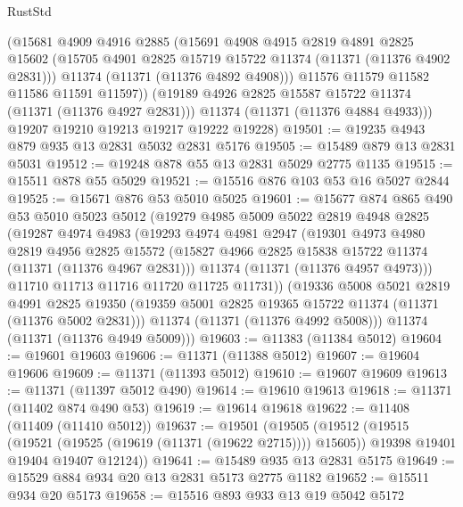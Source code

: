 \begin{lexlean}{RustStd}
\begin{coremodule}
          (@15681
            @4909
            @4916
            @2885
            (@15691
              @4908
              @4915
              @2819
              @4891
              @2825
              @15602
              (@15705 @4901 @2825 @15719 @15722 @11374 (@11371 (@11376 @4902 @2831)))
              @11374
              (@11371 (@11376 @4892 @4908)))
            @11576
            @11579
            @11582
            @11586
            @11591
            @11597))
        (@19189 @4926 @2825 @15587 @15722 @11374 (@11371 (@11376 @4927 @2831)))
        @11374
        (@11371 (@11376 @4884 @4933)))
      @19207
      @19210
      @19213
      @19217
      @19222
      @19228)
@19501 := @19235 @4943 @879 @935 @13 @2831 @5032 @2831 @5176
@19505 := @15489 @879 @13 @2831 @5031
@19512 := @19248 @878 @55 @13 @2831 @5029 @2775 @1135
@19515 := @15511 @878 @55 @5029
@19521 := @15516 @876 @103 @53 @16 @5027 @2844
@19525 := @15671 @876 @53 @5010 @5025
@19601 := @15677
    @874
    @865
    @490
    @53
    @5010
    @5023
    @5012
    (@19279
      @4985
      @5009
      @5022
      @2819
      @4948
      @2825
      (@19287
        @4974
        @4983
        (@19293
          @4974
          @4981
          @2947
          (@19301
            @4973
            @4980
            @2819
            @4956
            @2825
            @15572
            (@15827 @4966 @2825 @15838 @15722 @11374 (@11371 (@11376 @4967 @2831)))
            @11374
            (@11371 (@11376 @4957 @4973)))
          @11710
          @11713
          @11716
          @11720
          @11725
          @11731))
      (@19336
        @5008
        @5021
        @2819
        @4991
        @2825
        @19350
        (@19359 @5001 @2825 @19365 @15722 @11374 (@11371 (@11376 @5002 @2831)))
        @11374
        (@11371 (@11376 @4992 @5008)))
      @11374
      (@11371 (@11376 @4949 @5009)))
@19603 := @11383 (@11384 @5012)
@19604 := @19601 @19603
@19606 := @11371 (@11388 @5012)
@19607 := @19604 @19606
@19609 := @11371 (@11393 @5012)
@19610 := @19607 @19609
@19613 := @11371 (@11397 @5012 @490)
@19614 := @19610 @19613
@19618 := @11371 (@11402 @874 @490 @53)
@19619 := @19614 @19618
@19622 := @11408 (@11409 (@11410 @5012))
@19637 := @19501
    (@19505
      (@19512
        (@19515 (@19521 (@19525 (@19619 (@11371 (@19622 @2715)))) @15605))
        @19398
        @19401
        @19404
        @19407
        @12124))
@19641 := @15489 @935 @13 @2831 @5175
@19649 := @15529 @884 @934 @20 @13 @2831 @5173 @2775 @1182
@19652 := @15511 @934 @20 @5173
@19658 := @15516 @893 @933 @13 @19 @5042 @5172

\end{coremodule}
\end{lexlean}

